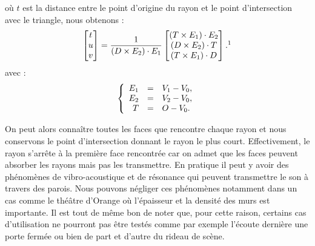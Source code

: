 %
où $t$ est la distance entre le point d'origine du rayon et le point d'intersection avec le triangle, nous obtenons :
%
\begin{equation}
	\begin{bmatrix}
 	 t \\
	 u \\
	 v
	\end{bmatrix}
	=
	\frac{1}{
 	  (D \times E_2)\cdot E_1
	}
	\begin{bmatrix}
 		  (T \times E_1)\cdot E_2
 \\ 
 		  (D \times E_2)\cdot T
 \\
 		  (T \times E_1)\cdot D
	\end{bmatrix}	.
	\footnotemark
\end{equation}
avec : 
\begin{equation}
   \left \{
   \begin{array}{r c l}
E_1 &=&  V_1-V_0,  \\
E_2 &=&  V_2-V_0,  \\
T &=& O - V_0.
   \end{array}
   \right .
\end{equation}
%

On peut alors connaître toutes les faces que rencontre chaque rayon et nous conservons le point d'intersection donnant le rayon le plus court. Effectivement, le rayon s'arrête à la première face rencontrée car on admet que les faces peuvent absorber les rayons mais pas les transmettre. En pratique il peut y avoir des phénomènes de vibro-acoustique et de résonance qui peuvent transmettre le son à travers des parois. Nous pouvons négliger ces phénomènes notamment dans un cas comme le théâtre d'Orange où l'épaisseur et la densité des murs est importante. Il est tout de même bon de noter que, pour cette raison, certains cas d'utilisation ne pourront pas être testés comme par exemple l'écoute dernière une porte fermée ou bien de part et d'autre du rideau de scène.

